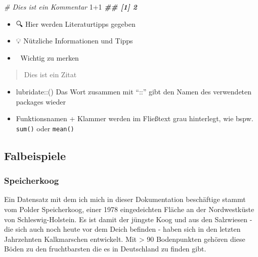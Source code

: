 \documentclass[
]{article}
\newenvironment{Shaded}{\begin{snugshade}}{\end{snugshade}}
\newcommand{\CommentTok}[1]{\textcolor[rgb]{0.56,0.35,0.01}{\textit{#1}}}
\newcommand{\DecValTok}[1]{\textcolor[rgb]{0.00,0.00,0.81}{#1}}
\newcommand{\DocumentationTok}[1]{\textcolor[rgb]{0.56,0.35,0.01}{\textbf{\textit{#1}}}}
\newcommand{\SpecialCharTok}[1]{\textcolor[rgb]{0.00,0.00,0.00}{#1}}
\begin{document}
\begin{Shaded}
\begin{Highlighting}[]
\CommentTok{\# Dies ist ein Kommentar }
\DecValTok{1}\SpecialCharTok{+}\DecValTok{1} 
\DocumentationTok{\#\# [1] 2}
\end{Highlighting}
\end{Shaded}

\begin{itemize}
\item
  🔍️ Hier werden Literaturtipps gegeben
\item
  💡 Nützliche Informationen und Tipps
\item
  🚨 Wichtig zu merken
\end{itemize}

\begin{quote}
Dies ist ein Zitat
\end{quote}

\begin{itemize}
\item
  lubridate::() Das Wort zusammen mit ``::'' gibt den Namen des verwendeten packages wieder
\item
  Funktionsnamen + Klammer werden im Fließtext grau hinterlegt, wie bspw. \texttt{sum()} oder \texttt{mean()}
\end{itemize}

\hypertarget{falbeispiele}{%
\subsection{Falbeispiele}\label{falbeispiele}}

\hypertarget{speicherkoog}{%
\subsubsection{Speicherkoog}\label{speicherkoog}}

Ein Datensatz mit dem ich mich in dieser Dokumentation beschäftige stammt vom Polder Speicherkoog, einer 1978 eingedeichten Fläche an der Nordwestküste von Schleswig-Holstein. Es ist damit der jüngste Koog und aus den Salzwiesen - die sich auch noch heute vor dem Deich befinden - haben sich in den letzten Jahrzehnten Kalkmarschen entwickelt. Mit \textgreater{} 90 Bodenpunkten gehören diese Böden zu den fruchtbarsten die es in Deutschland zu finden gibt.
\end{document}
